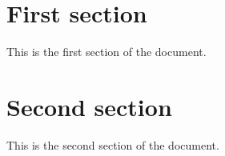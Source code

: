 \documentclass{scrartcl}
\begin{document}
\section{First section}
This is the first section of the document.

\section{Second section}
This is the second section of the document.
\end{document}
